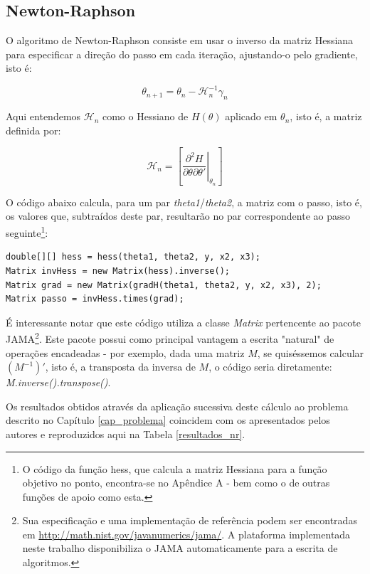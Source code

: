 \documentclass{abnt}
\newenvironment{mylisting}
{\begin{list}{}{\setlength{\leftmargin}{1em}}\item\scriptsize\bfseries}
{\end{list}}
\begin{document}
\subsection{Newton-Raphson}

	O algoritmo de Newton-Raphson consiste em usar o inverso da matriz Hessiana para especificar a direção do passo em cada iteração, ajustando-o pelo gradiente, isto é:

\[ \theta_{n+1} = \theta_{n} - \mathcal{H}_{n}^{-1}\gamma_{n} \]

Aqui entendemos $\mathcal{H}_n$ como o Hessiano de $H(\theta)$ aplicado em $\theta_n$, isto é, a matriz definida por:

	\[  \mathcal{H}_n = \left [ \left . \frac{\partial^2 H}{\partial \theta \partial \theta'} \right |_{\theta_n}  \right ] \]


O código abaixo calcula, para um par \textit{theta1}/\textit{theta2}, a matriz com o passo, isto é, os valores que, subtraídos deste par, resultarão no par correspondente ao passo seguinte\footnote{O código da função hess, que calcula a matriz Hessiana para a função objetivo no ponto, encontra-se no Apêndice A - bem como o de outras funções de apoio como esta.}:

\begin{mylisting}
\begin{verbatim}
double[][] hess = hess(theta1, theta2, y, x2, x3);
Matrix invHess = new Matrix(hess).inverse();
Matrix grad = new Matrix(gradH(theta1, theta2, y, x2, x3), 2);
Matrix passo = invHess.times(grad);
\end{verbatim}
\end{mylisting}

É interessante notar que este código utiliza a classe \textit{Matrix} pertencente  ao pacote JAMA\footnote{Sua especificação e uma implementação de referência podem ser encontradas em \url{http://math.nist.gov/javanumerics/jama/}. A plataforma implementada neste trabalho disponibiliza o JAMA automaticamente para a escrita de algoritmos.}. Este pacote possui como principal vantagem a escrita "natural" de operações encadeadas - por exemplo, dada uma matriz $M$, se quiséssemos calcular $(M^{-1})'$, isto é, a transposta da inversa de $M$, o código seria diretamente: \textit{M.inverse().transpose()}.

Os resultados obtidos através da aplicação sucessiva deste cálculo ao problema descrito no Capítulo \ref{cap_problema} coincidem com os apresentados pelos autores e reproduzidos aqui na Tabela \ref{resultados_nr}.
\end{document}
